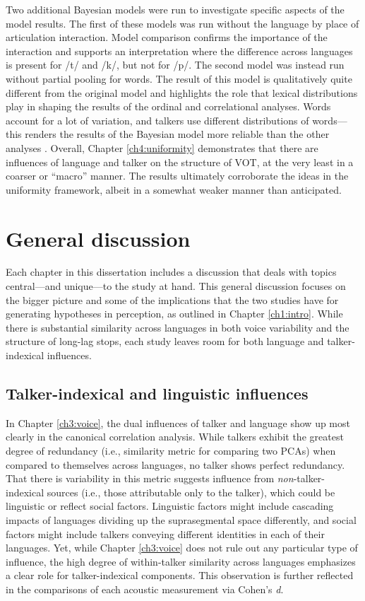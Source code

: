 Two additional Bayesian models were run to investigate specific aspects of the model results. The first of these models was run without the language by place of articulation interaction. Model comparison confirms the importance of the interaction and supports an interpretation where the difference across languages is present for /t/ and /k/, but not for /p/. The second model was instead run without partial pooling for words. The result of this model is qualitatively quite different from the original model and highlights the role that lexical distributions play in shaping the results of the ordinal and correlational analyses. Words account for a lot of variation, and talkers use different distributions of words---this renders the results of the Bayesian model more reliable than the other analyses \citep[cf.][]{haines_2020_theoretically}. Overall, Chapter \ref{ch4:uniformity} demonstrates that there are influences of language and talker on the structure of VOT, at the very least in a coarser or ``macro'' manner. The results ultimately corroborate the ideas in the uniformity framework, albeit in a somewhat weaker manner than anticipated. 

\section{General discussion}\label{ch5:sec:discussion}

Each chapter in this dissertation includes a discussion that deals with topics central---and unique---to the study at hand. This general discussion focuses on the bigger picture and some of the implications that the two studies have for generating hypotheses in perception, as outlined in Chapter \ref{ch1:intro}. While there is substantial similarity across languages in both voice variability and the structure of long-lag stops, each study leaves room for both language and talker-indexical influences. 

\subsection{Talker-indexical and linguistic influences}

In Chapter \ref{ch3:voice}, the dual influences of talker and language show up most clearly in the canonical correlation analysis. While talkers exhibit the greatest degree of redundancy (i.e., similarity metric for comparing two PCAs) when compared to themselves across languages, no talker shows perfect redundancy. That there is variability in this metric suggests influence from \textit{non}-talker-indexical sources (i.e., those attributable only to the talker), which could be linguistic or reflect social factors. Linguistic factors might include cascading impacts of languages dividing up the suprasegmental space differently, and social factors might include talkers conveying different identities in each of their languages. Yet, while Chapter \ref{ch3:voice} does not rule out any particular type of influence, the high degree of within-talker similarity across languages emphasizes a clear role for talker-indexical components. This observation is further reflected in the comparisons of each acoustic measurement via Cohen's \textit{d}. 


